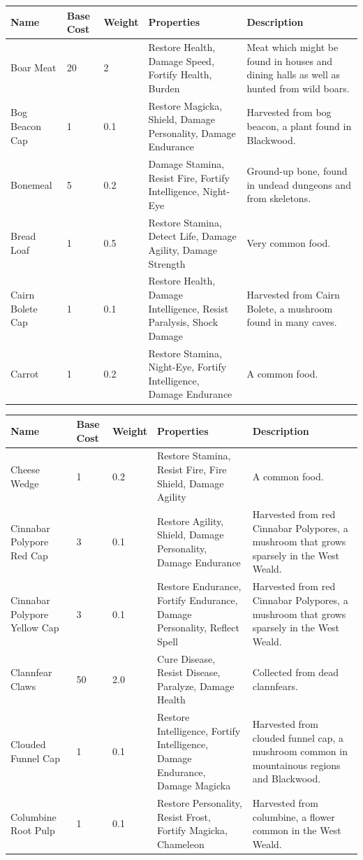 \documentclass[12pt]{book}
\begin{document}
\begin{tabular}{|p{}|p{}|p{}|p{}|p{}|}
\hline
Name & Base Cost & Weight & Properties & Description\\ \hline
Boar Meat & 20 & 2 & Restore Health, Damage Speed, Fortify Health, Burden & Meat which might be found in houses and dining halls as well as hunted from wild boars.\\ \hline
Bog Beacon Cap & 1 & 0.1 & Restore Magicka, Shield, Damage Personality, Damage Endurance & Harvested from bog beacon, a plant found in Blackwood.\\ \hline
Bonemeal & 5 & 0.2 & Damage Stamina, Resist Fire, Fortify Intelligence, Night-Eye & Ground-up bone, found in undead dungeons and from skeletons.\\ \hline
Bread Loaf & 1 & 0.5 & Restore Stamina, Detect Life, Damage Agility, Damage Strength & Very common food.\\ \hline
Cairn Bolete Cap & 1 & 0.1 & Restore Health, Damage Intelligence, Resist Paralysis, Shock Damage & Harvested from Cairn Bolete, a mushroom found in many caves.\\ \hline
Carrot & 1 & 0.2 & Restore Stamina, Night-Eye, Fortify Intelligence, Damage Endurance & A common food.\\ \hline
\end{tabular}

\begin{tabular}{|p{}|p{}|p{}|p{}|p{}|}
\hline
Name & Base Cost & Weight & Properties & Description\\ \hline
Cheese Wedge & 1 & 0.2 & Restore Stamina, Resist Fire, Fire Shield, Damage Agility & A common food.\\ \hline
Cinnabar Polypore Red Cap & 3 & 0.1 & Restore Agility, Shield, Damage Personality, Damage Endurance & Harvested from red Cinnabar Polypores, a mushroom that grows sparsely in the West Weald.\\ \hline
Cinnabar Polypore Yellow Cap & 3 & 0.1 & Restore Endurance, Fortify Endurance, Damage Personality, Reflect Spell & Harvested from red Cinnabar Polypores, a mushroom that grows sparsely in the West Weald.\\ \hline
Clannfear Claws & 50 & 2.0 & Cure Disease, Resist Disease, Paralyze, Damage Health & Collected from dead clannfears.\\ \hline
Clouded Funnel Cap & 1 & 0.1 & Restore Intelligence, Fortify Intelligence, Damage Endurance, Damage Magicka & Harvested from clouded funnel cap, a mushroom common in mountainous regions and Blackwood.\\ \hline
Columbine Root Pulp & 1 & 0.1 & Restore Personality, Resist Frost, Fortify Magicka, Chameleon & Harvested from columbine, a flower common in the West Weald.\\ \hline
\end{tabular}
\end{document}
